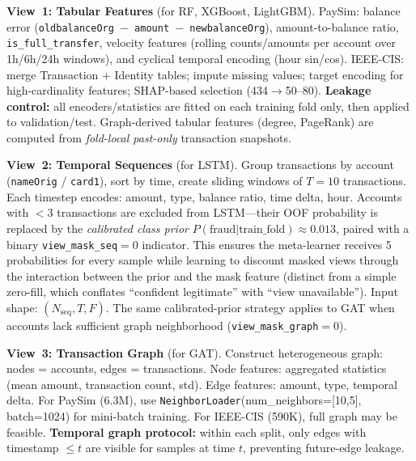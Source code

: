 \documentclass[10pt,a4paper,twocolumn]{article}
\begin{document}
\textbf{View~1: Tabular Features} (for RF, XGBoost, LightGBM). PaySim: balance error (\texttt{oldbalanceOrg $-$ amount $-$ newbalanceOrg}), amount-to-balance ratio, \texttt{is\_full\_transfer}, velocity features (rolling counts/amounts per account over 1h/6h/24h windows), and cyclical temporal encoding (hour sin/cos). IEEE-CIS: merge Transaction + Identity tables; impute missing values; target encoding for high-cardinality features; SHAP-based selection (434$\to$50--80). \textbf{Leakage control:} all encoders/statistics are fitted on each training fold only, then applied to validation/test. Graph-derived tabular features (degree, PageRank) are computed from \emph{fold-local past-only} transaction snapshots.

\textbf{View~2: Temporal Sequences} (for LSTM). Group transactions by account (\texttt{nameOrig} / \texttt{card1}), sort by time, create sliding windows of $T{=}10$ transactions. Each timestep encodes: amount, type, balance ratio, time delta, hour. Accounts with $<$3 transactions are excluded from LSTM---their OOF probability is replaced by the \emph{calibrated class prior} $P(\text{fraud}|\text{train\_fold}) \approx 0.013$, paired with a binary \texttt{view\_mask\_seq}$=0$ indicator. This ensures the meta-learner receives 5 probabilities for every sample while learning to discount masked views through the interaction between the prior and the mask feature (distinct from a simple zero-fill, which conflates ``confident legitimate'' with ``view unavailable''). Input shape: $(N_{\text{seq}}, T, F)$. The same calibrated-prior strategy applies to GAT when accounts lack sufficient graph neighborhood (\texttt{view\_mask\_graph}$=0$).

\textbf{View~3: Transaction Graph} (for GAT). Construct heterogeneous graph: nodes = accounts, edges = transactions. Node features: aggregated statistics (mean amount, transaction count, std). Edge features: amount, type, temporal delta. For PaySim (6.3M), use \texttt{NeighborLoader}(num\_neighbors=[10,5], batch=1024) for mini-batch training. For IEEE-CIS (590K), full graph may be feasible. \textbf{Temporal graph protocol:} within each split, only edges with timestamp $\leq t$ are visible for samples at time $t$, preventing future-edge leakage.

\noindent{}
\end{document}
